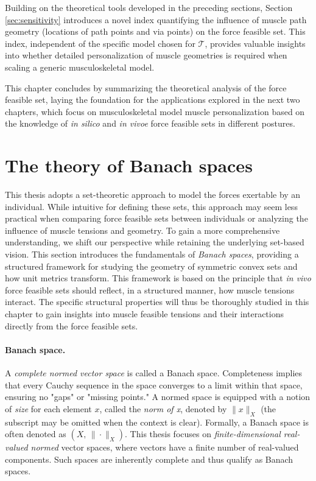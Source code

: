 Building on the theoretical tools developed in the preceding sections, Section \ref{sec:sensitivity} introduces a novel index quantifying the influence of muscle path geometry (locations of path points and via points) on the force feasible set. This index, independent of the specific model chosen for $\mathcal{T}$, provides valuable insights into whether detailed personalization of muscle geometries is required when scaling a generic musculoskeletal model.

This chapter concludes by summarizing the theoretical analysis of the force feasible set, laying the foundation for the applications explored in the next two chapters, which focus on musculoskeletal model muscle personalization based on the knowledge of \emph{in silico} and \emph{in vivoe} force feasible sets in different postures.

\section{The theory of Banach spaces}
\label{sec:theory_banach_spaces}
This thesis adopts a set-theoretic approach to model the forces exertable by an individual. While intuitive for defining these sets, this approach may seem less practical when comparing force feasible sets between individuals or analyzing the influence of muscle tensions and geometry. To gain a more comprehensive understanding, we shift our perspective while retaining the underlying set-based vision. This section introduces the fundamentals of \emph{Banach spaces}, providing a structured framework for studying the geometry of symmetric convex sets and how unit metrics transform. This framework is based on the principle that \emph{in vivo} force feasible sets should reflect, in a structured manner, how muscle tensions interact. The specific structural properties will thus be thoroughly studied in this chapter to gain insights into muscle feasible tensions and their interactions directly from the force feasible sets.

\paragraph*{Banach space.} A \emph{complete normed vector space} is called a Banach space.  Completeness implies that every Cauchy sequence in the space converges to a limit within that space, ensuring no "gaps" or "missing points."  A normed space is equipped with a notion of \emph{size} for each element $x$, called the \emph{norm of x}, denoted by $\|x\|_X$ (the subscript may be omitted when the context is clear). Formally, a Banach space is often denoted as $(X,\, \|\cdot \|_X)$. This thesis focuses on \emph{finite-dimensional real-valued normed} vector spaces, where vectors have a finite number of real-valued components.  Such spaces are inherently complete and thus qualify as Banach spaces.

